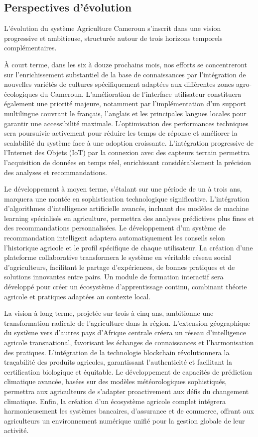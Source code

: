 \subsection{Perspectives d'évolution}

L'évolution du système Agriculture Cameroun s'inscrit dans une vision progressive et ambitieuse, structurée autour de trois horizons temporels complémentaires.

À court terme, dans les six à douze prochains mois, nos efforts se concentreront sur l'enrichissement substantiel de la base de connaissances par l'intégration de nouvelles variétés de cultures spécifiquement adaptées aux différentes zones agro-écologiques du Cameroun. L'amélioration de l'interface utilisateur constituera également une priorité majeure, notamment par l'implémentation d'un support multilingue couvrant le français, l'anglais et les principales langues locales pour garantir une accessibilité maximale. L'optimisation des performances techniques sera poursuivie activement pour réduire les temps de réponse et améliorer la scalabilité du système face à une adoption croissante. L'intégration progressive de l'Internet des Objets (IoT) par la connexion avec des capteurs terrain permettra l'acquisition de données en temps réel, enrichissant considérablement la précision des analyses et recommandations.

Le développement à moyen terme, s'étalant sur une période de un à trois ans, marquera une montée en sophistication technologique significative. L'intégration d'algorithmes d'intelligence artificielle avancés, incluant des modèles de machine learning spécialisés en agriculture, permettra des analyses prédictives plus fines et des recommandations personnalisées. Le développement d'un système de recommandation intelligent adaptera automatiquement les conseils selon l'historique agricole et le profil spécifique de chaque utilisateur. La création d'une plateforme collaborative transformera le système en véritable réseau social d'agriculteurs, facilitant le partage d'expériences, de bonnes pratiques et de solutions innovantes entre pairs. Un module de formation interactif sera développé pour créer un écosystème d'apprentissage continu, combinant théorie agricole et pratiques adaptées au contexte local.

La vision à long terme, projetée sur trois à cinq ans, ambitionne une transformation radicale de l'agriculture dans la région. L'extension géographique du système vers d'autres pays d'Afrique centrale créera un réseau d'intelligence agricole transnational, favorisant les échanges de connaissances et l'harmonisation des pratiques. L'intégration de la technologie blockchain révolutionnera la traçabilité des produits agricoles, garantissant l'authenticité et facilitant la certification biologique et équitable. Le développement de capacités de prédiction climatique avancée, basées sur des modèles météorologiques sophistiqués, permettra aux agriculteurs de s'adapter proactivement aux défis du changement climatique. Enfin, la création d'un écosystème agricole complet intégrera harmonieusement les systèmes bancaires, d'assurance et de commerce, offrant aux agriculteurs un environnement numérique unifié pour la gestion globale de leur activité.

